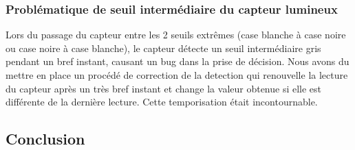 \subsubsection{Problématique de seuil intermédiaire du capteur lumineux}

Lors du passage du capteur entre les 2 seuils extrêmes (case blanche à case noire ou case noire à case blanche), le capteur détecte un seuil intermédiaire gris pendant un bref instant, causant un bug dans la prise de décision. Nous avons du mettre en place un procédé de correction de la detection qui renouvelle la lecture du capteur après un très bref instant et change la valeur obtenue si elle est différente de la dernière lecture. Cette temporisation était incontournable.

\subsection{Conclusion}
